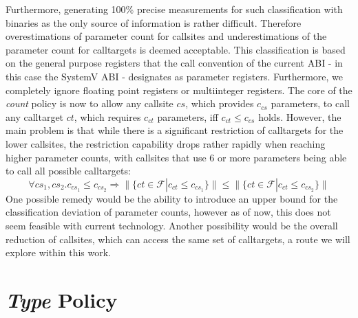  Furthermore, generating 100\% precise measurements for such classification with binaries as the only source of information is rather difficult. Therefore overestimations of parameter count for callsites and underestimations of the parameter count for calltargets is deemed acceptable. This classification is based on the general purpose registers that the call convention of the current ABI - in this case the SystemV ABI - designates as parameter registers. Furthermore, we completely ignore floating point registers or multiinteger registers. The core of the \emph{count} policy is now to allow any callsite $cs$, which provides $c_{cs}$ parameters, to call any calltarget $ct$, which requires $c_{ct}$ parameters, iff $c_{ct} \leq c_{cs}$ holds. However, the main problem is that while there is a significant restriction of calltargets for the lower callsites, the restriction capability drops rather rapidly when reaching higher parameter counts, with callsites that use 6 or more parameters being able to call all possible calltargets:
\[
	\forall cs_1, cs_2.  c_{cs_1} \leq c_{cs_2} \Longrightarrow  \| \{ct \in \mathcal{F} | c_{ct} \leq c_{cs_1} \} \| \leq \| \{ct \in \mathcal{F} | c_{ct} \leq c_{cs_2}  \} \|
\]
One possible remedy would be the ability to introduce an upper bound for the classification deviation of parameter counts, however as of now, this does not seem feasible with current technology. Another possibility would be the overall reduction of callsites, which can access the same set of calltargets, a route we will explore within this work.

\section{\emph{Type} Policy}
\label{section:typepolicy}

